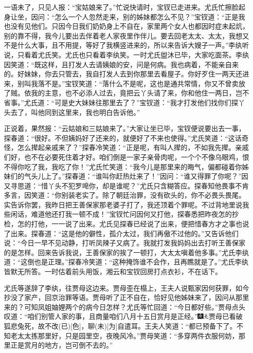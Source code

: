 一语未了，只见人报：“宝姑娘来了。”忙说快请时，宝钗已走进来。尤氏忙擦脸起身让坐，因问：“怎么一个人忽然走来，别的姊妹都怎么不见？”宝钗道：“正是我也没有见他们。只因今日我们奶奶身上不自在，家里两个女人也都因时症未起炕，别的靠不得，我今儿要出去伴着老人家夜里作伴儿。要去回老太太、太太，我想又不是什么大事，且不用提，等好了我横竖进来的，所以来告诉大嫂子一声。”李纨听说，只看着尤氏笑。尤氏也只看着李纨笑。一时尤氏盥沐已毕，大家吃面茶。李纨因笑道：“既这样，且打发人去请姨娘的安，问是何病。我也病着，不能亲自来的。好妹妹，你去只管去，我自打发人去到你那里去看屋子。你好歹住一两天还进来，别叫我落不是。”宝钗笑道：“落什么不是呢，这也是通共常情，你又不曾卖放了贼。依我的主意，也不必添人过去，竟把云丫头请了来，你和他住一两日，岂不省事。”尤氏道：“可是史大妹妹往那里去了？”宝钗道：“我才打发他们找你们探丫头去了，叫他同到这里来，我也明白告诉他。”

正说着，果然报：“云姑娘和三姑娘来了。”大家让坐已毕，宝钗便说要出去一事，探春道：“很好。不但姨妈好了还来的，就便好了不来也使得。”尤氏笑道：“这话奇怪，怎么撵起亲戚来了？”探春冷笑道：“正是呢，有叫人撵的，不如我先撵。亲戚们好，也不在必要死住着才好。咱们倒是一家子亲骨肉呢，一个个不像乌眼鸡，恨不得你吃了我，我吃了你！”尤氏忙笑道：“我今儿是那里来的晦气，偏都碰着你姊妹们的气头儿上了。”探春道：“谁叫你赶热灶来了！”因问：“谁又得罪了你呢？”因又寻思道：“惜丫头不犯罗唣你，却是谁呢？”尤氏只含糊答应。探春知他畏事不肯多言，因笑道：“你别装老实了。除了朝廷治罪，没有砍头的，你不必畏头畏尾。实告诉你罢，我昨日把王善保家那老婆子打了，我还顶着个罪呢。不过背地里说我些闲话，难道他还打我一顿不成！”宝钗忙问因何又打他，探春悉把昨夜怎的抄检，怎的打他，一一说了出来。尤氏见探春已经说了出来，便把惜春方才之事也说了出来。探春道：“这是他的僻性，孤介太过，我们再傲不过他的。”又告诉他们说：“今日一早不见动静，打听凤辣子又病了。我就打发我妈妈出去打听王善保家的是怎样。回来告诉我说，王善保家的挨了一顿打，大太太嗔着他多事。”尤氏李纨道：“这倒也是正理。”探春冷笑道：“这种掩饰谁不会作，且再瞧就是了。”尤氏李纨皆默无所答。一时估着前头用饭，湘云和宝钗回房打点衣衫，不在话下。

尤氏等遂辞了李纨，往贾母这边来。贾母歪在榻上，王夫人说甄家因何获罪，如今抄没了家产，回京治罪等语。贾母听了正不自在，恰好见他姊妹来了，因问从那里来的？可知凤姐妯娌两个的病今日怎样？尤氏等忙回道：“今日都好些。”贾母点头叹道：“咱们别管人家的事，且商量咱们八月十五日赏月是正经。”{\includegraphics[width=3mm]{../Images/00004}\includegraphics[width=3mm]{../Images/00012}\footnotesize \kaishu 贾母已看破狐悲兔死，故不改{(已)}{[}色{]}，聊{(未)}{[}为{]}自遣耳。}王夫人笑道：“都已预备下了。不知老太太拣那里好，只是园里空，夜晚风冷。”贾母笑道：“多穿两件衣服何妨，那里正是赏月的地方，岂可倒不去的。”

